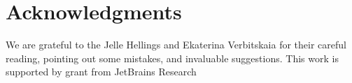 \section*{Acknowledgments}

We are grateful to the Jelle Hellings and Ekaterina Verbitskaia for their careful reading, pointing out some mistakes, and invaluable suggestions.
This work is supported by grant from JetBrains Research
